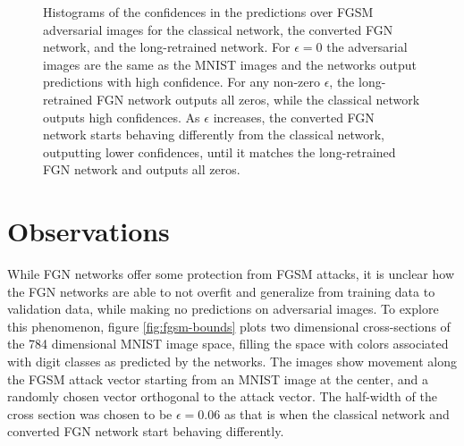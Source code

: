 \documentclass[12pt,oneside]{CUNY_PhD}
\begin{document}
\begin{figure}[!t]
{    }
    \caption{Histograms of the confidences in the predictions over FGSM adversarial images for the classical network, the converted FGN network, and the long-retrained network. For $\epsilon=0$ the adversarial images are the same as the MNIST images and the networks output predictions with high confidence. For any non-zero $\epsilon$, the long-retrained FGN network outputs all zeros, while the classical network outputs high confidences. As $\epsilon$ increases, the converted FGN network starts behaving differently from the classical network, outputting lower confidences, until it matches the long-retrained FGN network and outputs all zeros. }
    \label{fig:fgsm-compar}
\end{figure}

\section{Observations}
\label{Observations}
While FGN networks offer some protection from FGSM attacks, it is unclear how the FGN networks are able to not overfit and generalize from training data to validation data, while making no predictions on adversarial images. To explore this phenomenon, figure \ref{fig:fgsm-bounds} plots two dimensional cross-sections of the 784 dimensional MNIST image space, filling the space with colors associated with digit classes as predicted by the networks. The images show movement along the FGSM attack vector starting from an MNIST image at the center, and a randomly chosen vector orthogonal to the attack vector. The half-width of the cross section was chosen to be $\epsilon=0.06$ as that is when the classical network and converted FGN network start behaving differently. 
\end{document}
